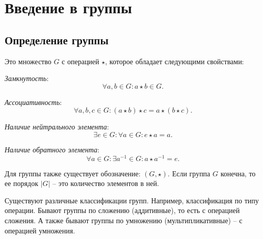 \section{Введение в группы}

\subsection{Определение группы}
\begin{definition}
    [Группа]
    Это множество $G$ с операцией $\star$, которое обладает следующими свойствами: 
    \begin{conditions}
        \item \textit{Замкнутость}: $$\forall a, b \in G: a \star b \in G.$$
        \item \textit{Ассоциативность}: $$\forall a, b, c \in G: (a \star b) \star c = a \star (b \star c).$$
        \item \textit{Наличие нейтрального элемента}: $$\exists e \in G: \forall a \in G: e \star a = a.$$
        \item \textit{Наличие обратного элемента}: $$\forall a \in G: \exists a^{-1} \in G: a \star a^{-1} = e.$$
    \end{conditions}
    Для группы также существует обозначение: $(G, \star).$
    Если группа $G$ конечна, то ее порядок $|G|$ -- это количество элементов в ней.
\end{definition}


Существуют различные классификации групп. Например, классификация по типу операции. 
Бывают группы по сложению (аддитивные), то есть с операцией сложения. 
А также бывают группы по умножению (мультипликативные) -- с операцией умножения.

